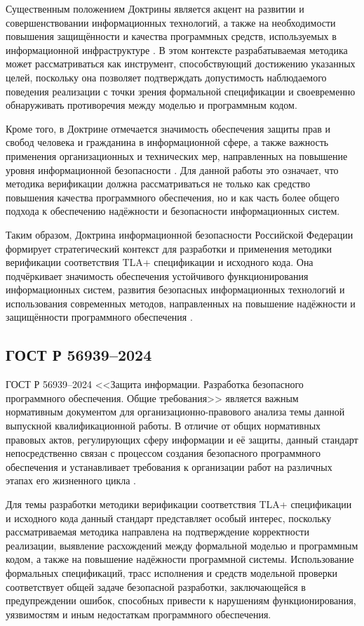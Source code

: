 Существенным положением Доктрины является акцент на развитии и
совершенствовании информационных технологий, а также на необходимости
повышения защищённости и качества программных средств, используемых в
информационной инфраструктуре \cite{doctrine_ib_rf}. В этом контексте
разрабатываемая методика может рассматриваться как инструмент,
способствующий достижению указанных целей, поскольку она позволяет
подтверждать допустимость наблюдаемого поведения реализации с точки зрения
формальной спецификации и своевременно обнаруживать противоречия между
моделью и программным кодом.

Кроме того, в Доктрине отмечается значимость обеспечения защиты прав и
свобод человека и гражданина в информационной сфере, а также важность
применения организационных и технических мер, направленных на повышение
уровня информационной безопасности \cite{doctrine_ib_rf}. Для данной
работы это означает, что методика верификации должна рассматриваться не
только как средство повышения качества программного обеспечения, но и как
часть более общего подхода к обеспечению надёжности и безопасности
информационных систем.

Таким образом, Доктрина информационной безопасности Российской Федерации
формирует стратегический контекст для разработки и применения методики
верификации соответствия TLA+ спецификации и исходного кода. Она
подчёркивает значимость обеспечения устойчивого функционирования
информационных систем, развития безопасных информационных технологий и
использования современных методов, направленных на повышение надёжности и
защищённости программного обеспечения \cite{doctrine_ib_rf}.

\subsection{ГОСТ Р 56939--2024}

ГОСТ Р 56939--2024 <<Защита информации. Разработка безопасного
программного обеспечения. Общие требования>> является важным нормативным
документом для организационно-правового анализа темы данной выпускной
квалификационной работы. В отличие от общих нормативных правовых актов,
регулирующих сферу информации и её защиты, данный стандарт непосредственно
связан с процессом создания безопасного программного обеспечения и
устанавливает требования к организации работ на различных этапах его
жизненного цикла \cite{gost_56939_2024}.

Для темы разработки методики верификации соответствия TLA+ спецификации и
исходного кода данный стандарт представляет особый интерес, поскольку
рассматриваемая методика направлена на подтверждение корректности
реализации, выявление расхождений между формальной моделью и программным
кодом, а также на повышение надёжности программной системы. Использование
формальных спецификаций, трасс исполнения и средств модельной проверки
соответствует общей задаче безопасной разработки, заключающейся в
предупреждении ошибок, способных привести к нарушениям функционирования,
уязвимостям и иным недостаткам программного обеспечения.

